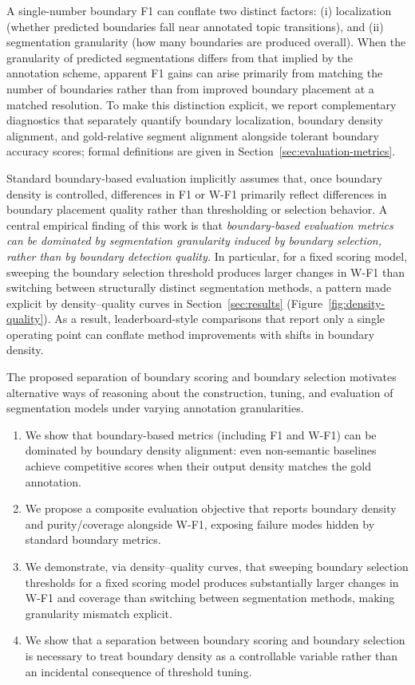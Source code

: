 \documentclass{article}
\begin{document}
A single-number boundary F1 can conflate two distinct factors: (i)
localization (whether predicted boundaries fall near annotated topic
transitions), and (ii) segmentation granularity (how many boundaries
are produced overall).  When the granularity of predicted segmentations
differs from that implied by the annotation scheme, apparent F1 gains
can arise primarily from matching the number of boundaries rather than
from improved boundary placement at a matched resolution. To make this
distinction explicit, we report complementary diagnostics that
separately quantify boundary localization, boundary density alignment,
and gold-relative segment alignment alongside tolerant boundary
accuracy scores; formal definitions are given in
Section~\ref{sec:evaluation-metrics}.

Standard boundary-based evaluation implicitly assumes that, once
boundary density is controlled, differences in F1 or W-F1 primarily
reflect differences in boundary placement quality rather than
thresholding or selection behavior.  A central empirical finding of
this work is that \emph{boundary-based evaluation metrics can be dominated
by segmentation granularity induced by boundary selection, rather than
by boundary detection quality.}  In particular, for a fixed scoring
model, sweeping the boundary selection threshold produces larger
changes in W-F1 than switching between structurally distinct
segmentation methods, a pattern made explicit by density--quality
curves in Section~\ref{sec:results}
(Figure~\ref{fig:density-quality}).  As a result, leaderboard-style
comparisons that report only a single operating point can conflate
method improvements with shifts in boundary density.

The proposed separation of boundary scoring and boundary
selection motivates alternative ways of reasoning about the
construction, tuning, and evaluation of segmentation models under
varying annotation granularities.

\begin{enumerate}
\item We show that boundary-based metrics (including F1 and W-F1) can
  be dominated by boundary density alignment: even non-semantic
  baselines achieve competitive scores when their output density
  matches the gold annotation.
\item We propose a composite evaluation objective that reports
  boundary density and purity/coverage alongside W-F1, exposing
  failure modes hidden by standard boundary metrics.
\item We demonstrate, via density--quality curves, that sweeping
  boundary selection thresholds for a fixed scoring model produces
  substantially larger changes in W-F1 and coverage than switching
  between segmentation methods, making granularity mismatch explicit.
\item We show that a separation between boundary scoring and boundary
  selection is necessary to treat boundary density as a controllable
  variable rather than an incidental consequence of threshold tuning.
\end{enumerate}
\end{document}
